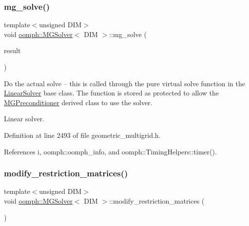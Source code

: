 \subsubsection{\texorpdfstring{mg\+\_\+solve()}{mg\_solve()}}
{\footnotesize\ttfamily template$<$unsigned D\+IM$>$ \\
void \hyperlink{classoomph_1_1MGSolver}{oomph\+::\+M\+G\+Solver}$<$ D\+IM $>$\+::mg\+\_\+solve (\begin{DoxyParamCaption}\item[{\hyperlink{classoomph_1_1DoubleVector}{Double\+Vector} \&}]{result }\end{DoxyParamCaption})\hspace{0.3cm}{\ttfamily [protected]}}



Do the actual solve -- this is called through the pure virtual solve function in the \hyperlink{classoomph_1_1LinearSolver}{Linear\+Solver} base class. The function is stored as protected to allow the \hyperlink{classoomph_1_1MGPreconditioner}{M\+G\+Preconditioner} derived class to use the solver. 

Linear solver. 

Definition at line 2493 of file geometric\+\_\+multigrid.\+h.



References i, oomph\+::oomph\+\_\+info, and oomph\+::\+Timing\+Helpers\+::timer().

\mbox{\label{classoomph_1_1MGSolver_ad31f3a5daa8edec01ab20c92e5fcca54}} 
\subsubsection{\texorpdfstring{modify\+\_\+restriction\+\_\+matrices()}{modify\_restriction\_matrices()}}
{\footnotesize\ttfamily template$<$unsigned D\+IM$>$ \\
void \hyperlink{classoomph_1_1MGSolver}{oomph\+::\+M\+G\+Solver}$<$ D\+IM $>$\+::modify\+\_\+restriction\+\_\+matrices (\begin{DoxyParamCaption}{ }\end{DoxyParamCaption})\hspace{0.3cm}{\ttfamily [protected]}}



